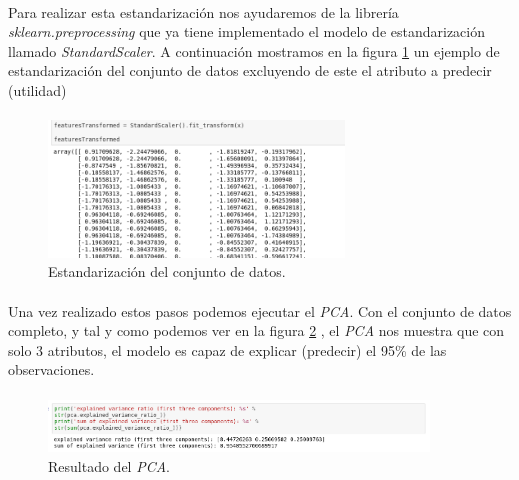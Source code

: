 \documentclass[10pt,a4paper,oneside]{book}
\begin{document}
\paragraph{}
Para realizar esta estandarización nos ayudaremos de la librería \textit{sklearn.preprocessing} que ya tiene implementado el modelo de estandarización llamado \textit{StandardScaler}. A continuación mostramos en la figura \ref{standarize1} un ejemplo de estandarización del conjunto de datos excluyendo de este el atributo a predecir (utilidad)

\paragraph{}
\begin{figure}[!htb]
  \centering
    \includegraphics[width=0.7\textwidth]{images/metodologia_procesado_de_datos_standarize.png}
    \caption{Estandarización del conjunto de datos.}
  \label{standarize1}
\end{figure}

\paragraph{}
Una vez realizado estos pasos podemos ejecutar el \textit{PCA}. Con el conjunto de datos completo, y tal y como podemos ver en la figura \ref{pcaOneResult} , el \textit{PCA} nos muestra que con solo 3 atributos, el modelo es capaz de explicar (predecir) el 95\% de las observaciones.

\paragraph{}
\begin{figure}[!htb]
  \centering
    \includegraphics[width=0.9\textwidth]{images/metodologia_procesado_de_datos_pca1_result.png}
    \caption{Resultado del \textit{PCA}.}
  \label{pcaOneResult}
\end{figure}
\end{document}

